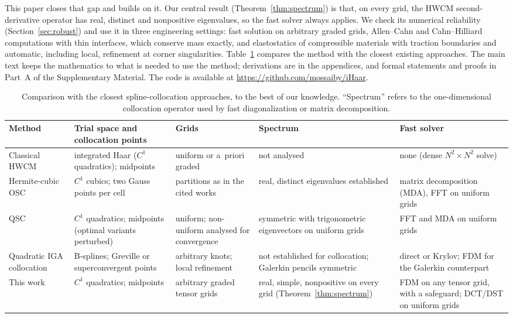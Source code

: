 \documentclass[preprint,12pt]{elsarticle}
\theoremstyle{remark}
\newcommand{\repo}{\url{https://github.com/mossaiby/iHaar}}
\begin{document}
This paper closes that gap and builds on it. Our central result (Theorem~\ref{thm:spectrum}) is that, on
every grid, the HWCM second-derivative operator has real, distinct and nonpositive eigenvalues, so the
fast solver always applies. We check its numerical reliability (Section~\ref{sec:robust}) and use it in
three engineering settings: fast solution on arbitrary graded grids, Allen--Cahn and Cahn--Hilliard
computations with thin interfaces, which conserve mass exactly, and elastostatics of compressible
materials with traction boundaries and automatic, including local, refinement at corner singularities.
Table~\ref{tab:closest} compares the method with the closest existing approaches. The main text keeps
the mathematics to what is needed to use the method; derivations are in the appendices, and formal
statements and proofs in Part~A of the Supplementary Material. The code is available at \repo.

\begin{table}[t]\centering\footnotesize
\caption{Comparison with the closest spline-collocation approaches, to the best of our knowledge. ``Spectrum'' refers to the one-dimensional collocation operator used by fast diagonalization or matrix decomposition.}\label{tab:closest}
\begin{tabular}{>{\raggedright\arraybackslash}p{}>{\raggedright\arraybackslash}p{}>{\raggedright\arraybackslash}p{}>{\raggedright\arraybackslash}p{}>{\raggedright\arraybackslash}p{}}
\toprule
Method & Trial space and collocation points & Grids & Spectrum & Fast solver\\
\midrule
Classical HWCM~\cite{lepik2011solving,oruc2019nonuniform} & integrated Haar ($C^1$ quadratics); midpoints & uniform or a~priori graded & not analysed & none (dense $N^2\times N^2$ solve)\\\addlinespace
Hermite-cubic OSC~\cite{dyksen1987tensor,sun1999spectral,bialecki1995matrix} & $C^1$ cubics; two Gauss points per cell & partitions as in the cited works & real, distinct eigenvalues established & matrix decomposition (MDA), FFT on uniform grids\\\addlinespace
QSC~\cite{houstis1988quadratic,christara2002fast,christara2006optimal} & $C^1$ quadratics; midpoints (optimal variants perturbed) & uniform; non-uniform analysed for convergence & symmetric with trigonometric eigenvectors on uniform grids & FFT and MDA on uniform grids\\\addlinespace
Quadratic IGA collocation~\cite{auricchio2010isogeometric,schillinger2013isogeometric,delorenzis2015isogeometric} & B-splines; Greville or superconvergent points & arbitrary knots; local refinement & not established for collocation; Galerkin pencils symmetric~\cite{sangalli2016isogeometric} & direct or Krylov; FDM for the Galerkin counterpart\\\addlinespace
This work & $C^1$ quadratics; midpoints & arbitrary graded tensor grids & real, simple, nonpositive on every grid (Theorem~\ref{thm:spectrum}) & FDM on any tensor grid, with a safeguard; DCT/DST on uniform grids\\
\bottomrule
\end{tabular}
\end{table}
\end{document}
